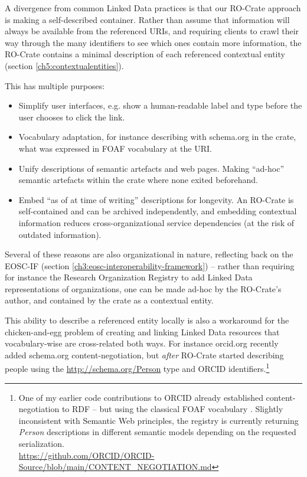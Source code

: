 A divergence from common Linked Data practices is that our RO-Crate approach is making a self-described container.
Rather than assume that information will always be available from the referenced URIs, and requiring clients to crawl their way through the many identifiers to see which ones contain more information, the RO-Crate contains a minimal description of each referenced contextual entity (section \vref{ch5:contextualentities}). 

This has multiple purposes:

\begin{itemize}
    \item Simplify user interfaces, e.g. show a human-readable label and type before the user chooses to click the link.
    \item Vocabulary adaptation, for instance describing with schema.org in the crate, what was expressed in FOAF vocabulary at the URI.
    \item Unify descriptions of semantic artefacts and web pages. 
          Making ``ad-hoc'' semantic artefacts within the crate where none exited beforehand.
    \item Embed ``as of at time of writing'' descriptions for longevity. 
          An RO-Crate is self-contained and can be archived independently, and embedding contextual information reduces cross-organizational service dependencies (at the risk of outdated information).
\end{itemize}

Several of these reasons are also organizational in nature, reflecting back on the 
\acrlong{EOSC-IF}
(section \vref{ch3:eosc-interoperability-framework}) -- rather than requiring for instance the Research Organization Registry  to add Linked Data representations of organizations, one can be made ad-hoc by the RO-Crate's author, and contained by the crate as a contextual entity. 

This ability to describe a referenced entity locally is also a workaround for the chicken-and-egg problem of creating and linking Linked Data resources that vocabulary-wise are cross-related both ways. For instance orcid.org recently added schema.org \gls{content-negotiation}, but \emph{after} RO-Crate started describing people using the \url{http://schema.org/Person} type and ORCID identifiers.\footnote{
  One of my earlier code contributions to ORCID already established content-negotiation to RDF -- but using the classical FOAF vocabulary \cite{Brickley 2014}.
  Slightly inconsistent with Semantic Web principles\footnotemark, the registry is currently returning \emph{Person} descriptions in different semantic models depending on the requested serialization. \\
  \url{https://github.com/ORCID/ORCID-Source/blob/main/CONTENT_NEGOTIATION.md}} 

